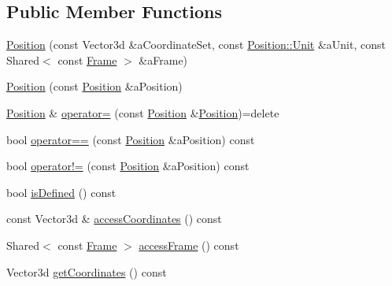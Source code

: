\subsection*{Public Member Functions}
\begin{DoxyCompactItemize}
\item 
\hyperlink{classlibrary_1_1physics_1_1coord_1_1_position_a68bead4a5057939ee5b6e77d2a8aa446}{Position} (const Vector3d \&a\+Coordinate\+Set, const \hyperlink{classlibrary_1_1physics_1_1units_1_1_length_a3b8b39cd245cf6b19dc34459baeccb18}{Position\+::\+Unit} \&a\+Unit, const Shared$<$ const \hyperlink{classlibrary_1_1physics_1_1coord_1_1_frame}{Frame} $>$ \&a\+Frame)
\item 
\hyperlink{classlibrary_1_1physics_1_1coord_1_1_position_a8916e7e373ca3f2bd44d7b41b7f2c2aa}{Position} (const \hyperlink{classlibrary_1_1physics_1_1coord_1_1_position}{Position} \&a\+Position)
\item 
\hyperlink{classlibrary_1_1physics_1_1coord_1_1_position}{Position} \& \hyperlink{classlibrary_1_1physics_1_1coord_1_1_position_a5efd032c43ad551922c7ffcd71961090}{operator=} (const \hyperlink{classlibrary_1_1physics_1_1coord_1_1_position}{Position} \&\hyperlink{classlibrary_1_1physics_1_1coord_1_1_position}{Position})=delete
\item 
bool \hyperlink{classlibrary_1_1physics_1_1coord_1_1_position_a520bfdf64e8f45f60e815ebc72012fde}{operator==} (const \hyperlink{classlibrary_1_1physics_1_1coord_1_1_position}{Position} \&a\+Position) const
\item 
bool \hyperlink{classlibrary_1_1physics_1_1coord_1_1_position_a78524e4b9328853ca6266defbe61fc7e}{operator!=} (const \hyperlink{classlibrary_1_1physics_1_1coord_1_1_position}{Position} \&a\+Position) const
\item 
bool \hyperlink{classlibrary_1_1physics_1_1coord_1_1_position_ac13492ffe13b093bb26173089db1a24b}{is\+Defined} () const
\item 
const Vector3d \& \hyperlink{classlibrary_1_1physics_1_1coord_1_1_position_abbcef57299f3416b88c458ea6bcd24e5}{access\+Coordinates} () const
\item 
Shared$<$ const \hyperlink{classlibrary_1_1physics_1_1coord_1_1_frame}{Frame} $>$ \hyperlink{classlibrary_1_1physics_1_1coord_1_1_position_a26c1f0eba51a3441106367eac1827455}{access\+Frame} () const
\item 
Vector3d \hyperlink{classlibrary_1_1physics_1_1coord_1_1_position_a35981f1150639afac722ccf13bf2f4bd}{get\+Coordinates} () const
\item 

\end{DoxyCompactItemize}
